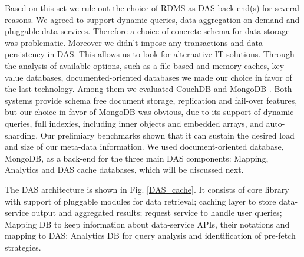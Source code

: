 \documentclass[1p,times]{elsarticle}
\begin{document}
\noindent
Based on this set we rule out the choice of RDMS as DAS back-end(s)
for several reasons. We agreed to support dynamic queries, data
aggregation on demand and pluggable data-services. Therefore a choice 
of concrete schema for data storage was problematic. Moreover we didn't impose
any transactions and data persistency in DAS. This allows us to look 
for alternative IT solutions.
Through the analysis of available options, such as a file-based and memory caches, 
key-value databases, documented-oriented databases we made our choice in favor 
of the last technology. Among them we evaluated CouchDB \cite{CouchDB} and 
MongoDB \cite{MongoDB}. Both systems provide schema free document
storage, replication and fail-over features, but our choice in favor of 
MongoDB was obvious, due to its support of dynamic queries, 
full indexies, including inner objects and embedded arrays,
and auto-sharding. Our prelimiary benchmarks shown that it can sustain
the desired load and size of our meta-data information. We used 
document-oriented database, MongoDB, as a back-end for the three 
main DAS components: Mapping, Analytics and DAS cache databases, 
which will be discussed next. 

The DAS architecture is shown in Fig. \ref{DAS_cache}. It consists of
core library with support of pluggable modules for data retrieval;
caching layer to store data-service output and aggregated results;
request service to handle user queries;
Mapping DB to keep information about data-service APIs, their
notations and mapping to DAS;
Analytics DB for query analysis and identification of pre-fetch 
strategies.
\end{document}
